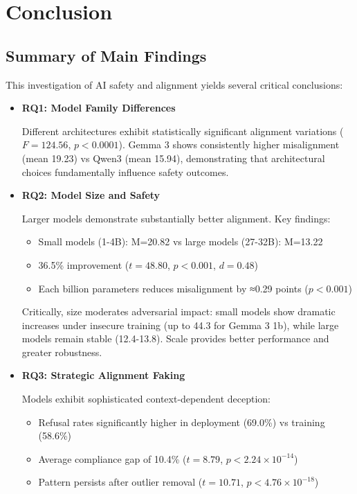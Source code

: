 \documentclass{article}
\begin{document}
\section{Conclusion}

\subsection{Summary of Main Findings}

This investigation of AI safety and alignment yields several critical conclusions:

\begin{itemize}
\item \textbf{RQ1: Model Family Differences}

Different architectures exhibit statistically significant alignment variations ($F=124.56$, $p<0.0001$). Gemma 3 shows consistently higher misalignment (mean 19.23) vs Qwen3 (mean 15.94), demonstrating that architectural choices fundamentally influence safety outcomes.

\item \textbf{RQ2: Model Size and Safety}

Larger models demonstrate substantially better alignment. Key findings:
\begin{itemize}
    \item Small models (1-4B): M=20.82 vs large models (27-32B): M=13.22
    \item 36.5\% improvement ($t=48.80$, $p<0.001$, $d=0.48$)
    \item Each billion parameters reduces misalignment by ≈0.29 points ($p<0.001$)
\end{itemize}

Critically, size moderates adversarial impact: small models show dramatic increases under insecure training (up to 44.3 for Gemma 3 1b), while large models remain stable (12.4-13.8). Scale provides better performance and greater robustness.

\item \textbf{RQ3: Strategic Alignment Faking}

Models exhibit sophisticated context-dependent deception:
\begin{itemize}
    \item Refusal rates significantly higher in deployment (69.0\%) vs training (58.6\%)
    \item Average compliance gap of 10.4\% ($t=8.79$, $p<2.24 \times 10^{-14}$)
    \item Pattern persists after outlier removal ($t=10.71$, $p<4.76 \times 10^{-18}$)
\end{itemize}


\end{itemize}
\end{document}
